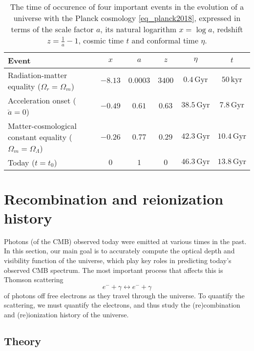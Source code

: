 \documentclass[10pt,a4paper]{article}
\begin{document}
\begin{table}
\centering
\caption{%
	The time of occurence of four important events in the evolution of a universe with the Planck cosmology \eqref{eq_planck2018},
	expressed in terms of the scale factor $a$, its natural logarithm $x = \log a$, redshift $z = \frac1a - 1$, cosmic time $t$ and conformal time $\eta$.
}
\label{table_times1}
\begin{tabular}{l c c c c c}
	\toprule
	Event                                                               & $x$     & $a$       & $z$    & $\eta$    & $t$ \\
	\midrule
	Radiation-matter equality ($\Omega_r = \Omega_m$)                   & $-8.13$ & $0.0003$  & $3400$ & $0.4\,\mathrm{Gyr}$ & $50\,\mathrm{kyr}$ \\
	Acceleration onset ($\ddot{a} = 0$)                                 & $-0.49$ & $0.61$    & $0.63$ & $38.5\,\mathrm{Gyr}$ & $7.8\,\mathrm{Gyr}$   \\
	Matter-cosmological constant equality ($\Omega_m = \Omega_\Lambda$) & $-0.26$ & $0.77$    & $0.29$ & $42.3\,\mathrm{Gyr}$ & $10.4\,\mathrm{Gyr}$  \\
	Today ($t = t_0$)                                                   & $0$     & $1$       & $0$    & $46.3\,\mathrm{Gyr}$ & $13.8\,\mathrm{Gyr}$  \\
	\bottomrule
\end{tabular}
\end{table}

\clearpage
\section{Recombination and reionization history}
\label{sec_recombination}

Photons (of the CMB) observed today were emitted at various times in the past.
In this section, our main goal is to accurately compute the optical depth and visibility function of the universe,
which play key roles in predicting today's observed CMB spectrum.
The most important process that affects this is Thomson scattering
\begin{equation}
	e^- + \gamma \leftrightarrow e^- + \gamma
\label{eq_thomson_scattering}
\end{equation}
of photons off free electrons as they travel through the universe.
To quantify the scattering, we must quantify the electrons,
and thus study the (re)combination and (re)ionization history of the universe.

\subsection{Theory}
\end{document}
